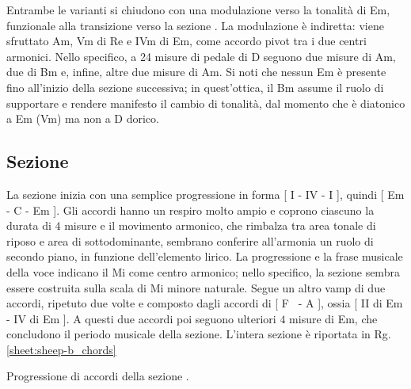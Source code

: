 \documentclass[class=book, crop=false, oneside, 12pt]{standalone}
\begin{document}
    Entrambe le varianti si chiudono con una modulazione verso la tonalità di Em, funzionale alla transizione verso la sezione . La modulazione è indiretta: viene sfruttato Am, Vm di Re e IVm di Em,  come accordo pivot tra i due centri armonici. Nello specifico, a 24 misure di pedale di D seguono due misure di Am, due di Bm e, infine, altre due misure di Am. Si noti che nessun Em è presente fino all'inizio della sezione successiva; in quest'ottica,  il Bm assume il ruolo di supportare e rendere manifesto il cambio di tonalità, dal momento che è diatonico a Em (Vm) ma non a D dorico. 

    \subsection{Sezione }
    La sezione  inizia con una semplice progressione in forma [ I - IV - I ], quindi [ Em - C - Em ]. Gli accordi hanno un respiro molto ampio e coprono ciascuno la durata di \(4\) misure e il movimento armonico, che rimbalza tra area tonale di riposo e area di sottodominante, sembrano conferire all'armonia un ruolo di secondo piano, in funzione dell'elemento lirico. La progressione e la frase musicale della voce indicano il Mi come centro armonico; nello specifico, la sezione sembra essere costruita sulla scala di Mi minore naturale.
    Segue un altro vamp di due accordi, ripetuto due volte e composto dagli accordi di [ F\sharp~ - A ], ossia [ II di Em - IV di Em ].  A questi due accordi poi seguono ulteriori \(4\) misure di Em, che concludono il periodo musicale della sezione. L'intera sezione è riportata in Rg.\ref{sheet:sheep-b_chords}

    \begin{sheet}[htb]
        \centering
        \caption{Progressione di accordi della sezione .}
        \label{sheet:sheep-b_chords}
    \end{sheet}
    
\end{document}
